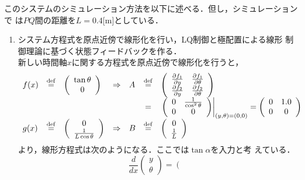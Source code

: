 このシステムのシミュレーション方法を以下に述べる．但し，シミュレーションで
は$PQ$間の距離を$L = 0.4$[m]としている．
\begin{enumerate}
 \renewcommand{\labelenumi}{\sffamily\bfseries case \arabic{enumi}}
 \item 
       システム方程式を原点近傍で線形化を行い，LQ制御と極配置による線形
       制御理論に基づく状態フィードバックを作る． \\
       新しい時間軸$x$に関する方程式を原点近傍で線形化を行うと，
\begin{equation*}
\begin{array}{lclclcl}
 f(x) &\stackrel{\rm def}{=}&
 \left(
 \begin{array}{c}
  \tan \theta \\
  0
 \end{array}
 \right) &\Rightarrow&
 A &\stackrel{\rm def}{=}&
 \left(
 \begin{array}{cc}
  \frac{\partial f_1}{\partial y} & \frac{\partial f_1}{\partial \theta} \\
  \frac{\partial f_2}{\partial y} & \frac{\partial f_2}{\partial \theta} 
 \end{array}
 \right) \\
 & & & & &=&
 \left. \left(
 \begin{array}{cc}
  0 & \frac{1}{\cos ^2 \theta} \\
  0 & 0
 \end{array}
 \right) \right|_{(y,\theta) = (0, 0)} =
 \left(
 \begin{array}{cc}
  0 & 1.0 \\
  0 & 0
 \end{array}
 \right) \\
 g(x) &\stackrel{\rm def}{=}&
 \left(
 \begin{array}{c}
  0 \\
  \frac{1}{L \cos \theta}
 \end{array}
 \right) &\Rightarrow&
 B &\stackrel{\rm def}{=}&
 \left(
 \begin{array}{c}
  0 \\
  \frac{1}{L}
 \end{array}
 \right)
\end{array}
\end{equation*}
       より，線形方程式は次のようになる．ここでは$\tan \alpha$を入力と考
       えている．
\begin{equation}
 \frac{d}{dx}\left(\begin{array}{c}
     y \\
     \theta 
   \end{array} \right) = \left(\begin{array}{cc}

\end{array}
\end{equation}
\end{enumerate}

